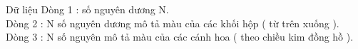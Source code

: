 Dữ liệu  
Dòng 1 : số nguyên dương N.   
\\   Dòng 2 : N số nguyên dương mô tả màu của các khối hộp ( từ   trên xuống ).   
\\   Dòng 3 : N số nguyên mô tả màu của các cánh hoa ( theo chiều   kim đồng hồ ).